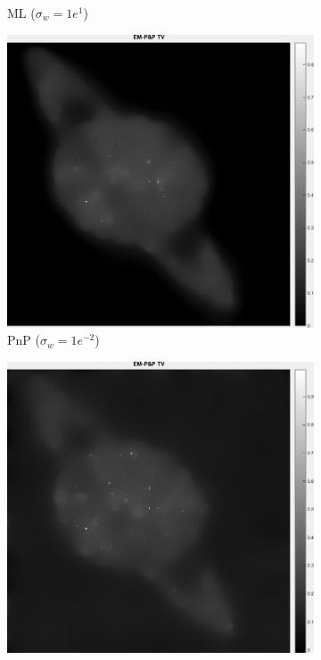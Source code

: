 \documentclass[a4paper, 11pt]{article}
\begin{document}
\begin{figure}[h]
\begin{subfigure}[b]{0.22\textwidth}
        \caption{ML ($\sigma_w=1e^{1}$)}
        \label{fig:ML1}
    \end{subfigure}
    \begin{subfigure}[b]{0.22\textwidth}
        \includegraphics[width=\textwidth]{../Figures/PnPReconstructionNoiseSigma1e-2.png}
        \caption{PnP ($\sigma_w=1e^{-2}$)}
        \label{fig:PnP-2}
    \end{subfigure}
    \begin{subfigure}[b]{0.22\textwidth}
        \includegraphics[width=\textwidth]{../Figures/PnPReconstructionNoiseSigma1e-1.png}

\end{subfigure}
\end{figure}
\end{document}
